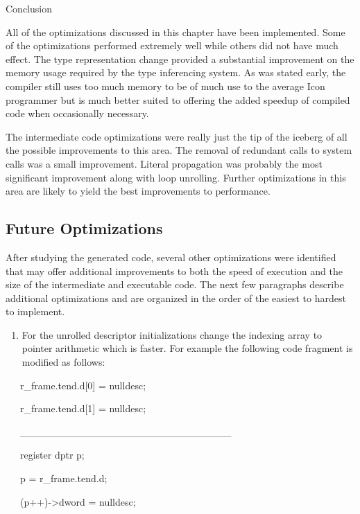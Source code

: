 {\sffamily
Conclusion}

All of the optimizations discussed in this chapter have been
implemented. Some of the optimizations performed extremely well while
others did not have much effect. The type representation change
provided a substantial improvement on the memory usage required by the
type inferencing system. As was stated early, the compiler still uses
too much memory to be of much use to the average Icon programmer but
is much better suited to offering the added speedup of compiled code
when occasionally necessary.

The intermediate code optimizations were really just the tip of the
iceberg of all the possible improvements to this area. The removal of
redundant calls to system calls was a small improvement. Literal
propagation was probably the most significant improvement along with
loop unrolling. Further optimizations in this area are likely to yield
the best improvements to performance.

\subsection{Future Optimizations}

After studying the generated code, several other optimizations were
identified that may offer additional improvements to both the speed of
execution and the size of the intermediate and executable code. The
next few paragraphs describe additional optimizations and are
organized in the order of the easiest to hardest to implement.

\liststyleLxxxvi
\begin{enumerate}
\item 
For the unrolled descriptor initializations change the indexing array to pointer arithmetic which is faster. For example
the following code fragment is modified as follows: 
\end{enumerate}
{\ttfamily\mdseries
\ \ \ r\_frame.tend.d[0] = nulldesc;}

{\ttfamily\mdseries
\ \ \ r\_frame.tend.d[1] = nulldesc;}

{\ttfamily\mdseries
\ \ \ \_\_\_\_\_\_\_\_\_\_\_\_\_\_\_\_\_\_\_\_\_\_\_\_\_\_\_\_\_}


\bigskip

{\ttfamily\mdseries
\ \ \ register dptr p;}

{\ttfamily\mdseries
\ \ \ p = r\_frame.tend.d;}

{\ttfamily\mdseries
\ \ \ (p++)-{\textgreater}dword = nulldesc;}

